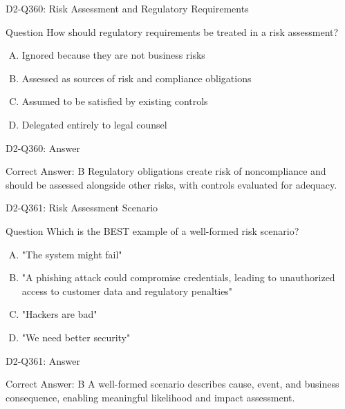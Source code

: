 \documentclass{beamer}
\begin{document}
\begin{frame}{D2-Q360: Risk Assessment and Regulatory Requirements}
	\begin{block}{Question}
		How should regulatory requirements be treated in a risk assessment?
	\end{block}
	\begin{enumerate}[(A)]
		\item Ignored because they are not business risks
		\item Assessed as sources of risk and compliance obligations
		\item Assumed to be satisfied by existing controls
		\item Delegated entirely to legal counsel
	\end{enumerate}
\end{frame}
\begin{frame}{D2-Q360: Answer}
	\begin{block}{Correct Answer: B}
		Regulatory obligations create risk of noncompliance and should be assessed alongside other risks, with controls evaluated for adequacy.
	\end{block}
\end{frame}

\begin{frame}{D2-Q361: Risk Assessment Scenario}
	\begin{block}{Question}
		Which is the BEST example of a well-formed risk scenario?
	\end{block}
	\begin{enumerate}[(A)]
		\item "The system might fail"
		\item "A phishing attack could compromise credentials, leading to unauthorized access to customer data and regulatory penalties"
		\item "Hackers are bad"
		\item "We need better security"
	\end{enumerate}
\end{frame}
\begin{frame}{D2-Q361: Answer}
	\begin{block}{Correct Answer: B}
		A well-formed scenario describes cause, event, and business consequence, enabling meaningful likelihood and impact assessment.
	\end{block}
\end{frame}
\end{document}
